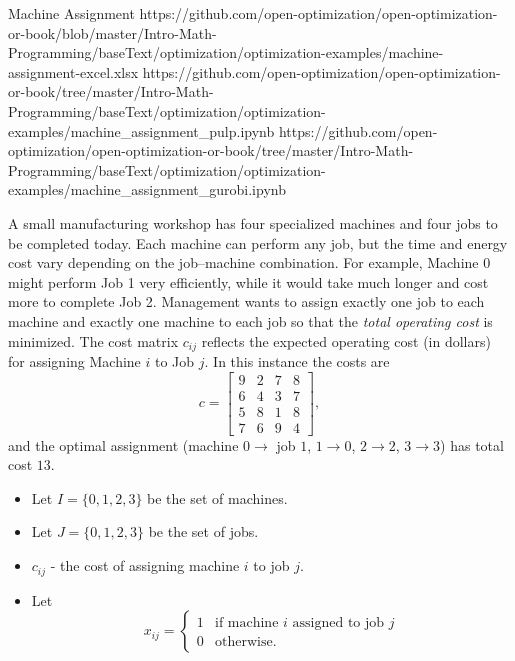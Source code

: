 \begin{examplewithallcode}{Machine Assignment}
{https://github.com/open-optimization/open-optimization-or-book/blob/master/Intro-Math-Programming/baseText/optimization/optimization-examples/machine-assignment-excel.xlsx}
{https://github.com/open-optimization/open-optimization-or-book/tree/master/Intro-Math-Programming/baseText/optimization/optimization-examples/machine_assignment_pulp.ipynb}
{https://github.com/open-optimization/open-optimization-or-book/tree/master/Intro-Math-Programming/baseText/optimization/optimization-examples/machine_assignment_gurobi.ipynb}
\label{ex:machine-assignment}

A small manufacturing workshop has four specialized machines and four jobs to be completed today.  
Each machine can perform any job, but the time and energy cost vary depending on the job–machine combination.  
For example, Machine 0 might perform Job 1 very efficiently, while it would take much longer and cost more to complete Job 2.
Management wants to assign exactly one job to each machine and exactly one machine to each job so that the \emph{total operating cost} is minimized.  
The cost matrix \(c_{ij}\) reflects the expected operating cost (in dollars) for assigning Machine \(i\) to Job \(j\).  In this instance the costs are
\[
c = \begin{bmatrix} 9 & 2 & 7 & 8 \\ 6 & 4 & 3 & 7 \\ 5 & 8 & 1 & 8 \\ 7 & 6 & 9 & 4 \end{bmatrix},
\]
and the optimal assignment (machine $0 \to$ job $1$, $1 \to 0$, $2 \to 2$, $3 \to 3$) has total cost $13$.


\begin{itemize}
\item Let $I = \{0,1,2,3\}$ be the set of machines.
\item Let $J = \{0,1, 2,3\}$ be the set of jobs.
\end{itemize}

\begin{itemize}
\item $c_{ij}$ - the cost of assigning machine $i$ to job $j$.
\end{itemize}

\begin{itemize}
\item Let
\begin{equation*}
x_{ij} = \begin{cases}
1 & \text{if machine $i$ assigned to job $j$}\\
0 & \text{otherwise.}
\end{cases}
\end{equation*}
\end{itemize}


\end{examplewithallcode}

